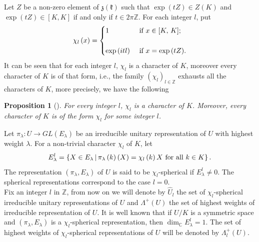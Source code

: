 \documentclass[11pt,a4paper]{amsart}
\newtheorem{proposition}[theorem]{Proposition}
\theoremstyle{definition}
\numberwithin{equation}{section}
\begin{document}
Let $Z$ be a non-zero  element of $\mathfrak{z}(\mathfrak{k})$  such that $\exp\left( tZ\right) \in Z\left( K\right) $ and \\ $\exp(tZ) \in \left[K,K \right]$ if and only if $t \in 2 \pi \mathbb{Z}$.  For each integer $l$, put
\[
\chi_l\left( x \right) =
\begin{cases}
1 &\text{ if \( x \in \left[K, \, K \right] \);}  \\ \\
\exp\left(itl \right)  &\text{ if \( x=\exp\left(tZ \right)  \).}
\end{cases}
\] 
It can be seen that for each integer $l$, $\chi_l$ is a character of $K$, moreover every character of $K$ is of that form, i.e., the family $\left( \chi_l\right)_{l \in \mathbb{Z}}$ exhausts all the characters of $K$, more precisely, we have the following
\begin{proposition}[\cite{Schlichtkrull}] 
	For every integer $l$, $\chi_l$ is a character of $K$. Moreover, every character of $K$ is of the form $\chi_l$ for some integer $l$.	
\end{proposition}
Let $\pi_{\lambda}:U \longrightarrow GL(E_{\lambda})$ be an irreducible unitary representation of $U$ with highest weight $\lambda$. For a non-trivial character $\chi_l$ of $K$, let
\begin{equation}\label{fixed vectors by K}
E_{\lambda}^{l}=\left\lbrace X \in E_{\lambda} \, \arrowvert \,  \pi_\lambda\left(k \right)\left(X \right) =\chi_l\left( k\right)X    \text{ for all } k \in K\right\rbrace. 
\end{equation}
The representation  $\left(  \pi_\lambda, E_{\lambda}\right)$ 
of $U$ is said to be $\chi_l$-spherical if $E_{\lambda}^{l} \neq 0$. The spherical representations correspond to the case  $l=0$. \\

Fix an integer $l$ in $\mathbb{Z}$, from now on we will denote by $\widehat{U}_l$ the set of $\chi_l$-spherical irreducible unitary representations of $U$ and $\Lambda^+(U)$   the set of highest weights of irreducible representation of $U$. 
It is  well known that if $U/K$ is a symmetric space and $\left(\pi_\lambda, E_\lambda\right)$ is a $\chi_l$-spherical representation, then $\dim_{\mathbb{C}} E_{\lambda}^l =1$. The set of highest weights of $\chi_l$-spherical representations of $U$ will be denoted by $\Lambda_l^+\left( U\right) $.\\ 
\end{document}
